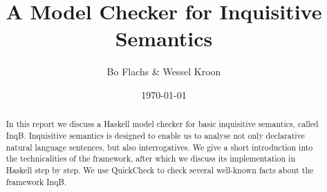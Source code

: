 \documentclass[12pt,a4paper]{article}
\title{A Model Checker for Inquisitive Semantics}
\author{Bo Flachs \& Wessel Kroon}
\date{\today}
\begin{document}
\maketitle

\begin{abstract}
In this report we discuss a Haskell model checker for basic inquisitive semantics, called \textsf{InqB}. Inquisitive semantics is designed to enable us to analyse not only declarative natural language sentences, but also interrogatives. We give a short introduction into the technicalities of the framework, after which we discuss its implementation in Haskell step by step. We use QuickCheck to check several well-known facts about the framework \textsf{InqB}.
\end{abstract}

\tableofcontents

\clearpage

























\end{document}
